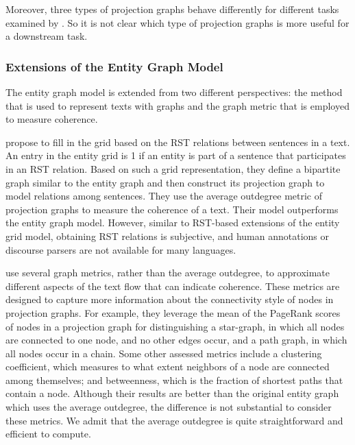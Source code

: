 Moreover, three types of projection graphs behave differently for different tasks examined by . 
So it is not clear which type of projection graphs is more useful for a downstream task. 

\subsubsection{Extensions of the Entity Graph Model}

The entity graph model is extended from two different perspectives: the method that is used to represent texts with graphs and the graph metric that is employed to measure coherence. 

 propose to fill in the grid based on the RST relations between sentences in a text. 
An entry in the entity grid is 1 if an entity is part of a sentence that participates in an RST relation.
Based on such a grid representation, they define a bipartite graph similar to the entity graph and then construct its projection graph to model relations among sentences. 
They use the average outdegree metric of projection graphs to measure the coherence of a text. 
Their model outperforms the entity graph model. 
However, similar to RST-based extensions of the entity grid model, obtaining RST relations is subjective, and human annotations or discourse parsers are not available for many languages. 

 use several graph metrics, rather than the average outdegree, to approximate different aspects of the text flow that can indicate coherence.  
These metrics are designed to capture more information about the connectivity style of nodes in projection graphs. 
For example, they leverage the mean of the PageRank scores \cite{newmanmark10} of nodes in a projection graph for distinguishing a star-graph, in which all nodes are connected to one node, and no other edges occur, and a path graph, in which all nodes occur in a chain. 
Some other assessed metrics include a clustering coefficient, which measures to what extent neighbors of a node are connected among themselves; and betweenness, which is the fraction of shortest paths that contain a node. 
Although their results are better than the original entity graph which uses the average outdegree, the difference is not substantial to consider these metrics. 
We admit that the average outdegree is quite straightforward and efficient to compute. 

